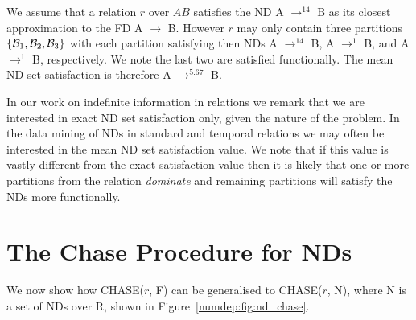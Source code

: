 \begin{example}\label{ex:mean_nd}
\begin{rm}
We assume that a relation $r$ over $AB$ satisfies the ND A $\to^{14}$ B
as its closest approximation to the FD A $\to$ B. However $r$ may only
contain three partitions  $\{{\cal B}_1, {\cal B}_2, {\cal B}_3\}$
with each partition satisfying then NDs A $\to^{14}$ B, A $\to^{1}$ B,
and A $\to^{1}$ B, respectively. We note the last two are satisfied
functionally. The mean ND set satisfaction is therefore A $\to^{5.67}$ B.
\end{rm}
\end{example}

In our work on indefinite information in relations we remark that we
are interested in exact ND set satisfaction only, given the nature of
the problem. In the data mining of NDs in standard and temporal
relations we may often be interested in the mean ND set satisfaction
value. We note that if this value is vastly different from the exact
satisfaction value then it is likely that one or more partitions from
the relation {\em dominate} and remaining partitions will satisfy the
NDs more functionally.

\section{The Chase Procedure for NDs}\label{sec:nd_chase}

We now show how CHASE($r$, F) can be generalised to CHASE($r$, N), where N is
a set of NDs over R, shown in Figure~\ref{numdep:fig:nd_chase}.


